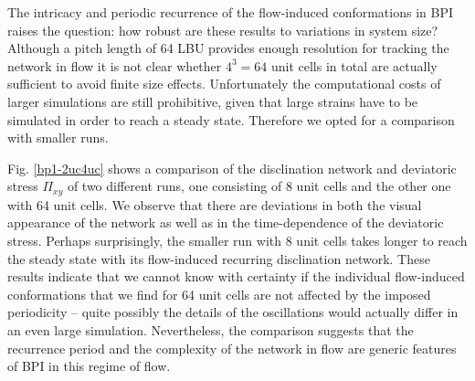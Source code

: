 \documentclass[aps,pre,reprint,superscriptaddress, twocolumn]{revtex4}
\begin{document}
The intricacy and periodic recurrence of the flow-induced conformations 
in BPI raises the question: how robust are these results to variations in 
system size? Although a pitch length of 64 LBU provides enough resolution 
for tracking the network in flow it is not clear whether $4^3=64$ unit cells 
in total are actually sufficient to avoid finite size effects.
Unfortunately the computational costs of larger simulations are still
prohibitive, given that large strains have to
be simulated in order to reach a steady state. Therefore we opted for a 
comparison with smaller runs.

Fig. \ref{bp1-2uc4uc} shows a comparison of the disclination network and 
deviatoric stress $\Pi_{xy}$ of two different runs, one consisting of 8 
unit cells and the other one with 64 unit cells.
We observe that there are deviations in both the visual appearance of the 
network as well as in the time-dependence of the deviatoric stress.
Perhaps surprisingly, the smaller run with 8 unit cells takes longer 
to reach the steady state with its flow-induced recurring disclination network. 
These results indicate that we cannot know with certainty if the individual 
flow-induced conformations that we find for 64 unit cells are not affected 
by the imposed periodicity -- quite possibly the details of the oscillations
would actually differ in an even large simulation. 
Nevertheless, the comparison suggests that 
the recurrence period and the complexity of the network in flow are  
generic features of BPI in this regime of flow.
 
\end{document}

